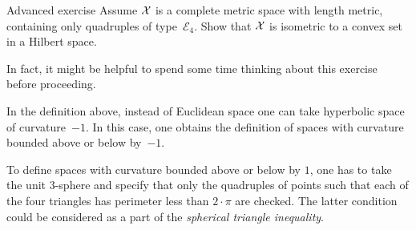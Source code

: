 \begin{thm}{Advanced exercise}\label{ex:convex-set}
Assume $\mathcal{X}$ is a complete metric space with length metric, 
containing only quadruples of type~$\mathcal{E}_4$.
Show that $\mathcal{X}$ is isometric to a convex set in a Hilbert space.
\end{thm}

In fact, it might be helpful to spend some time thinking about this exercise before proceeding.

In the definition above, 
instead of  Euclidean space 
one can take  
hyperbolic space of curvature~$-1$.
In this case,
one obtains the definition of spaces with curvature bounded above or below by~$-1$.

To define spaces with curvature bounded above or below by $1$,
one has to take the unit 3-sphere 
and specify that only the quadruples of points such that each of the four triangles has perimeter 
less than $2\cdot\pi$ are checked.
The latter condition could be considered as a part of the {}\emph{spherical triangle inequality}.
